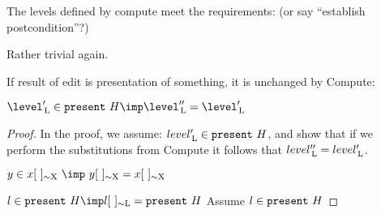 The levels defined by compute meet the requirements: (or say ``establish postcondition''?)


Rather trivial again.


If result of edit is presentation of something, it is unchanged by {\sc Compute}: 


$\level'\L \in \present~H \imp \level''\L = \level'\L$

\begin{proof}  In the proof, we assume: $level'_{\, \mathrm L} \in {\tt present}~H$, and show that if we perform the substitutions from {\sc Compute} it follows that $level''_{\, \mathrm L} = level'_{\, \mathrm L}$.


$y \in x \eqcl{}{X} ~\imp~ y \eqcl{}{X} =  x\eqcl{}{X}$



$l \in \present~H \imp l\eqcl{}{L} = \present~H$
Assume $l \in {\tt present}~H$ 


\end{proof}

